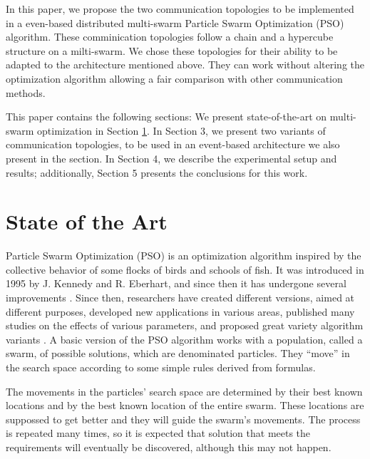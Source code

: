 \documentclass[runningheads]{llncs}
\begin{document}
In this paper, we propose the two communication topologies to be
implemented in a even-based distributed multi-swarm Particle Swarm
Optimization (PSO) algorithm.  These comminication topologies follow a
chain and a hypercube structure on a milti-swarm. We chose these
topologies for their ability to be adapted to the architecture
mentioned above. They can work without altering the optimization
algorithm allowing a fair comparison with other communication methods.

This paper contains the following sections: We present
state-of-the-art on multi-swarm optimization in Section
\ref{sec:soa}. In Section 3, we present two variants of communication
topologies, to be used in an event-based architecture we also present
in the section. In Section 4, we describe the experimental setup and
results; additionally, Section 5 presents the conclusions for this
work.

\section{State of the Art}
\label{sec:soa}

Particle Swarm Optimization (PSO) is an optimization algorithm
inspired by the collective behavior of some flocks of birds and schools of fish. It was introduced in 1995 by  J. Kennedy and
R. Eberhart, and since then it has undergone several improvements \cite{b1}. %
Since then, researchers have created different versions, aimed at different
purposes, developed new applications in various areas, published many
studies on the effects of various parameters, and proposed great
variety algorithm variants \cite{b2}. %
A basic version of the PSO algorithm
works with a population, called a swarm, of possible solutions, which
are denominated particles. They ``move'' in the search space according to
some simple rules derived from formulas. %

The movements in the particles' search space are
determined by their best known locations and by the best known location
of the entire swarm. %
These locations are suppossed to get better and they will
guide the swarm's movements. The process is repeated many times, so it
is expected that solution that meets the requirements will eventually be
discovered, although this may not happen\cite{b3}. %
\end{document}
